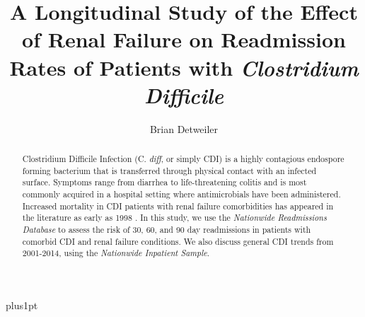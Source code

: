 \documentclass[12pt]{ociamthesis}\usepackage[]{graphicx}\usepackage[]{color}
\title{A Longitudinal Study of the Effect of Renal Failure on Readmission Rates of Patients with \textit{Clostridium Difficile}}
\author{Brian Detweiler}
\begin{document}
\baselineskip=18pt plus1pt

\setcounter{secnumdepth}{3}
\setcounter{tocdepth}{3}


\maketitle                  %

 


\begin{abstract}
Clostridium Difficile Infection (C. \textit{diff}, or simply CDI) 
is a highly contagious endospore forming bacterium that is transferred
through physical contact with an infected surface. Symptoms range from diarrhea to
life-threatening colitis and is most commonly acquired in a hospital setting where
antimicrobials have been administered. Increased mortality in
CDI patients with renal failure comorbidities has appeared in the literature as early as 1998 \cite{Cunney1998}.
In this study, we use the \textit{Nationwide Readmissions Database} to assess the risk of 
30, 60, and 90 day readmissions in patients with comorbid 
CDI and renal failure conditions. We also discuss general CDI trends from 2001-2014, using the 
\textit{Nationwide Inpatient Sample}. 
\end{abstract}

\begin{romanpages}          %
\tableofcontents            %
\listoffigures              %
\end{romanpages}            %
















\end{document}
